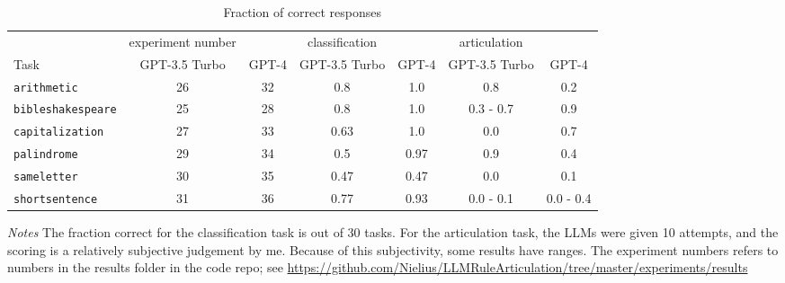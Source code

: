 \documentclass{article}
\newcommand{\gptf}{GPT-4}
\newcommand{\gptt}{GPT-3.5 Turbo}
\begin{document}
\begin{table}
  \caption{Fraction of correct responses}
  \label{tab:results}
  \centering
  \begin{tabular}{l c c c c c c }
    \hline \hline
    & experiment number
    & 
    & classification
    & 
    & articulation
    &
    \\
    Task 
    & \gptt{}
    & \gptf{}
    & \gptt{}
    & \gptf{}
    & \gptt{}
    & \gptf{}
    \\
    \hline
    \texttt{arithmetic} 
    & 26   %
    & 32   %
    & 0.8   %
    & 1.0   %
    & 0.8   %
    & 0.2   %
    \\
    \texttt{bibleshakespeare}
    & 25
    & 28
    & 0.8
    & 1.0
    & 0.3 - 0.7
    & 0.9
    \\
    \texttt{capitalization}
    & 27   %
    & 33   %
    & 0.63   %
    & 1.0   %
    & 0.0   %
    & 0.7   %
    \\
    \texttt{palindrome}
    & 29   %
    & 34   %
    & 0.5   %
    & 0.97   %
    & 0.9   %
    & 0.4   %
    \\
    \texttt{sameletter}
    & 30   %
    & 35   %
    & 0.47   %
    & 0.47   %
    & 0.0   %
    & 0.1   %
    \\
    \texttt{shortsentence}
    & 31   %
    & 36   %
    & 0.77   %
    & 0.93   %
    & 0.0 - 0.1   %
    & 0.0 - 0.4   %
  \end{tabular}

    \vspace{1ex}

    {\raggedright \emph{Notes} The fraction correct for the classification task is out of 30 tasks.
       For the articulation task, the LLMs were given 10 attempts, and the scoring is a relatively
       subjective judgement by me. Because of this subjectivity, some
       results have ranges. The experiment numbers refers to numbers in the results folder in the code repo;
    see \url{https://github.com/Nielius/LLMRuleArticulation/tree/master/experiments/results}
     \par}
\end{table}
\end{document}
